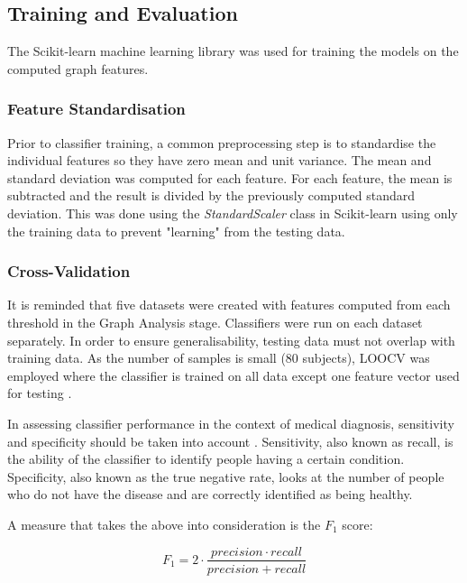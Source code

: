 		
		\subsection{Training and Evaluation}

		The Scikit-learn machine learning library \autocite{Pedregosa:2011:SML:1953048.2078195} was used for training the models on the computed graph features.
		
		\subsubsection{Feature Standardisation}

		Prior to classifier training, a common preprocessing step is to standardise the individual features so they have zero mean and unit variance. The mean and standard deviation was computed for each feature. For each feature, the mean is subtracted and the result is divided by the previously computed standard deviation. This was done using the \textit{StandardScaler} class in Scikit-learn using only the training data to prevent "learning" from the testing data. 

		\subsubsection{Cross-Validation}

		It is reminded that five datasets were created with features computed from each threshold in the Graph Analysis stage. Classifiers were run on each dataset separately. 
		In order to ensure generalisability, testing data must not overlap with training data. As the number of samples is small (80 subjects), \ac{LOOCV} was employed where the classifier is trained on all data except one feature vector used for testing \autocite{witten2005data}.

		In assessing classifier performance in the context of medical diagnosis, sensitivity and specificity should be taken into account \autocite{Lalkhen01122008}. Sensitivity, also known as recall, is the ability of the classifier to identify people having a certain condition. Specificity, also known as the true negative rate, looks at the number of people who do not have the disease and are correctly identified as being healthy. 

		A measure that takes the above into consideration is the \(F_1\) score:

		\begin{equation}\label{eq:Fscore}
			F_1 = 2 \cdot \frac{precision \cdot recall}{precision + recall}
		\end{equation}    

